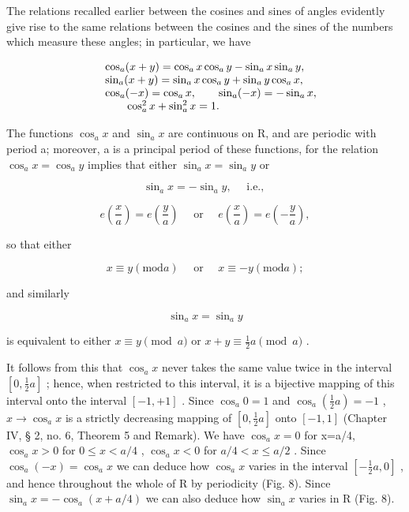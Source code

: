 The relations recalled earlier between the cosines and sines of angles evidently give rise to the same relations between the cosines and the sines of the numbers which measure these angles; in particular, we have

\[
\begin{array}{r l} & {\cos_ {a} (x + y) = \cos_ {a} x \cos_ {a} y - \sin_ {a} x \sin_ {a} y,} \\ & {\sin_ {a} (x + y) = \sin_ {a} x \cos_ {a} y + \sin_ {a} y \cos_ {a} x,} \\ & {\cos_ {a} (- x) = \cos_ {a} x, \qquad \sin_ {a} (- x) = - \sin_ {a} x,} \\ & {\qquad \cos_ {a} ^ {2} x + \sin_ {a} ^ {2} x = 1.} \end{array}
\]

The functions \(\cos_{a}x\) and \(\sin_{a}x\) are continuous on R, and are periodic with period a; moreover, a is a principal period of these functions, for the relation \(\cos_{a}x = \cos_{a}y\) implies that either \(\sin_{a}x = \sin_{a}y\) or

\[
\sin_ {a} x = - \sin_ {a} y, \quad \text { i.e., }
\]

\[
e \left(\frac {x}{a}\right) = e \left(\frac {y}{a}\right) \quad \text { or } \quad e \left(\frac {x}{a}\right) = e \left(- \frac {y}{a}\right),
\]

so that either

\[
x \equiv y (\mathrm{mod} a) \quad \text { or } \quad x \equiv - y (\mathrm{mod} a);
\]

and similarly

\[
\sin_ {a} x = \sin_ {a} y
\]

is equivalent to either \(x \equiv y \pmod{a}\) or \(x + y \equiv \frac{1}{2} a \pmod{a}\) .

It follows from this that \(\cos_{a}x\) never takes the same value twice in the interval \([0,\frac{1}{2}a]\) ; hence, when restricted to this interval, it is a bijective mapping of this interval onto the interval \([-1,+1]\) . Since \(\cos_{a}0=1\) and \(\cos_{a}\left(\frac{1}{2}a\right)=-1\) , \(x\to\cos_{a}x\) is a strictly decreasing mapping of \([0,\frac{1}{2}a]\) onto \([-1,1]\) (Chapter IV, § 2, no. 6, Theorem 5 and Remark). We have \(\cos_{a}x=0\) for x=a/4, \(\cos_{a}x>0\) for \(0\leqslant x<a/4\) , \(\cos_{a}x<0\) for \(a/4<x\leqslant a/2\) . Since \(\cos_{a}(-x)=\cos_{a}x\) we can deduce how \(\cos_{a}x\) varies in the interval \([-\frac{1}{2}a,0]\) , and hence throughout the whole of R by periodicity (Fig. 8). Since \(\sin_{a}x=-\cos_{a}(x+a/4)\) we can also deduce how \(\sin_{a}x\) varies in R (Fig. 8).

